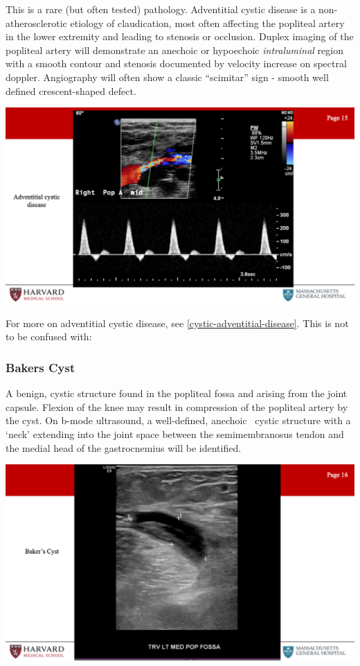 \documentclass[
]{book}
\begin{document}
This is a rare (but often tested) pathology. Adventitial cystic disease
is a non-atherosclerotic etiology of claudication, most often affecting
the popliteal artery in the lower extremity and leading to stenosis or
occlusion. Duplex imaging of the popliteal artery will demonstrate an
anechoic or hypoechoic \emph{intraluminal} region with a smooth contour and
stenosis documented by velocity increase on spectral doppler.
Angiography will often show a classic ``scimitar'' sign - smooth well
defined crescent-shaped defect.\citep{shaw2007, winn2015}

\includegraphics[width=15.01in]{images/vasc_lab2/Slide16}

For more on adventitial cystic disease, see
\ref{cystic-adventitial-disease}. This is not to be confused with:

\hypertarget{bakers-cyst}{%
\subsubsection{Bakers Cyst}\label{bakers-cyst}}

A benign, cystic structure found in the popliteal fossa and arising from
the joint capsule. Flexion of the knee may result in compression of the
popliteal artery by the cyst. On b-mode ultrasound, a well-defined,
anechoic~ cystic structure with a `neck' extending into the joint space
between the semimembranosus tendon and the medial head of the
gastrocnemius will be identified.

\includegraphics[width=15.01in]{images/vasc_lab2/Slide17}
\end{document}
